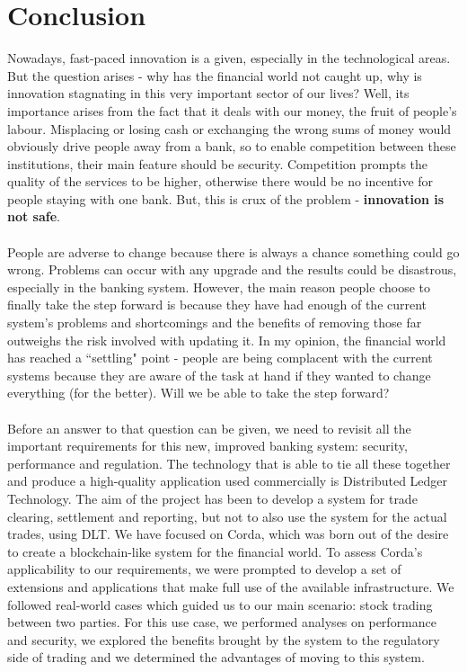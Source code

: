 \documentclass[12pt,twoside]{article}
\begin{document}
\section{Conclusion}
\label{sec:Conclusion}
Nowadays, fast-paced innovation is a given, especially in the technological areas. But the question arises - why has the financial world not caught up, why is innovation stagnating in this very important sector of our lives? Well, its importance arises from the fact that it deals with our money, the fruit of people's labour. Misplacing or losing cash or exchanging the wrong sums of money would obviously drive people away from a bank, so to enable competition between these institutions, their main feature should be security. Competition prompts the quality of the services to be higher, otherwise there would be no incentive for people staying with one bank. But, this is crux of the problem - \textbf{innovation is not safe}. 
\\ \\
People are adverse to change because there is always a chance something could go wrong. Problems can occur with any upgrade and the results could be disastrous, especially in the banking system. However, the main reason people choose to finally take the step forward is because they have had enough of the current system's problems and shortcomings and the benefits of removing those far outweighs the risk involved with updating it. In my opinion, the financial world has reached a ``settling" point - people are being complacent with the current systems because they are aware of the task at hand if they wanted to change everything (for the better). Will we be able to take the step forward?
\\ \\
Before an answer to that question can be given, we need to revisit all the important requirements for this new, improved banking system: security, performance and regulation.  The technology that is able to tie all these together and produce a high-quality application used commercially is Distributed Ledger Technology. The aim of the project has been to develop a system for trade clearing, settlement and reporting, but not to also use the system for the actual trades, using DLT. We have focused on Corda, which was born out of the desire to create a blockchain-like system for the financial world. To assess Corda's applicability to our requirements, we were prompted to develop a set of extensions and applications that make full use of the available infrastructure. We followed real-world cases which guided us to our main scenario: stock trading between two parties. For this use case, we performed analyses on performance and security, we explored the benefits brought by the system to the regulatory side of trading and we determined the advantages of moving to this system.
\end{document}
